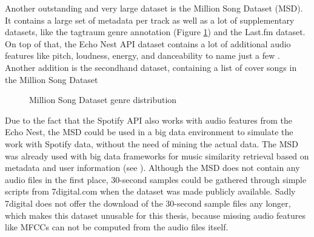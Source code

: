 Another outstanding and very large dataset is the Million Song Dataset (MSD)\cite{msd1}. 
It contains a large set of metadata per track as well as a lot of supplementary datasets, like the tagtraum genre annotation (Figure \ref{msddist})\cite{msd5} and the Last.fm dataset\cite{msd2}. On top of that, the Echo Nest API dataset contains a lot of additional audio features like pitch, loudness, energy, and danceability to name just a few \cite{msd3}. 
Another addition is the secondhand dataset, containing a list of cover songs in the Million Song Dataset\cite{msd6}
\begin{figure}[thpb]
	\centering
	\caption{Million Song Dataset genre distribution \cite[p. 6]{msd5}}
	\label{msddist}
\end{figure}
\FloatBarrier
\noindent Due to the fact that the Spotify API\cite{spotifyapi1} also works with audio features from the Echo Nest\cite{echonest1}, the MSD could be used in a big data environment to simulate the work with Spotify data, without the need of mining the actual data. The MSD was already used with big data frameworks for music similarity retrieval based on metadata and user information (see \cite{msd4}). Although the MSD does not contain any audio files in the first place, 30-second samples could be gathered through simple scripts from 7digital.com when the dataset was made publicly available. Sadly 7digital does not offer the download of the 30-second sample files any longer, which makes this dataset unusable for this thesis, because missing audio features like MFCCs can not be computed from the audio files itself. 
